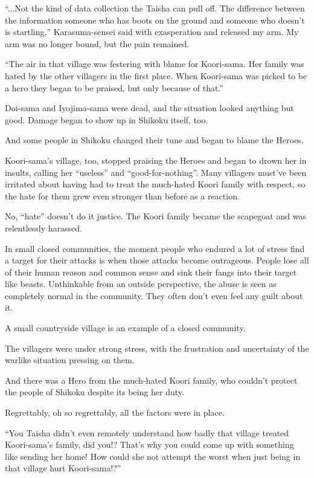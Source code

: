 ``...Not the kind of data collection the Taisha can pull off. The difference between the information someone who has boots on the ground and someone who doesn't is startling,'' Karasuma-sensei said with exasperation and released my arm. My arm was no longer bound, but the pain remained.

``The air in that village was festering with blame for Koori-sama. Her family was hated by the other villagers in the first place. When Koori-sama was picked to be a hero they began to be praised, but only because of that.''

Doi-sama and Iyojima-sama were dead, and the situation looked anything but good. Damage began to show up in Shikoku itself, too.

And some people in Shikoku changed their tune and began to blame the Heroes.

Koori-sama's village, too, stopped praising the Heroes and began to drown her in insults, calling her ``useless'' and ``good-for-nothing''. Many villagers must've been irritated about having had to treat the much-hated Koori family with respect, so the hate for them grew even stronger than before as a reaction.

No, ``hate'' doesn't do it justice. The Koori family became the scapegoat and was relentlessly harassed.

In small closed communities, the moment people who endured a lot of stress find a target for their attacks is when those attacks become outrageous. People lose all of their human reason and common sense and sink their fangs into their target like beasts. Unthinkable from an outside perspective, the abuse is seen as completely normal in the community. They often don't even feel any guilt about it.

A small countryside village is an example of a closed community.

The villagers were under strong stress, with the frustration and uncertainty of the warlike situation pressing on them.

And there was a Hero from the much-hated Koori family, who couldn't protect the people of Shikoku despite its being her duty.

Regrettably, oh so regrettably, all the factors were in place.

``You Taisha didn't even remotely understand how badly that village treated Koori-sama's family, did you!? That's why you could come up with something like sending her home! How could she not attempt the worst when just being in that village hurt Koori-sama!?''

